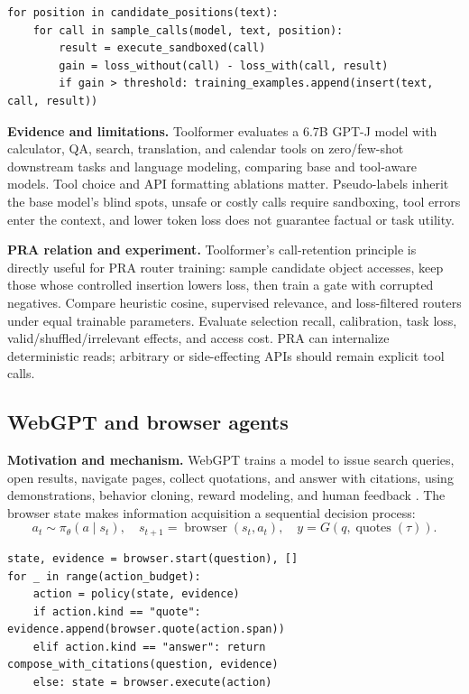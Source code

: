 \begin{lstlisting}[caption={Loss-improvement filtering for pseudo-labeled calls}]
for position in candidate_positions(text):
    for call in sample_calls(model, text, position):
        result = execute_sandboxed(call)
        gain = loss_without(call) - loss_with(call, result)
        if gain > threshold: training_examples.append(insert(text, call, result))
\end{lstlisting}

\textbf{Evidence and limitations.} Toolformer evaluates a 6.7B GPT-J model with calculator,
QA, search, translation, and calendar tools on zero/few-shot downstream tasks and language
modeling, comparing base and tool-aware models.  Tool choice and API formatting ablations
matter.  Pseudo-labels inherit the base model's blind spots, unsafe or costly calls require
sandboxing, tool errors enter the context, and lower token loss does not guarantee factual
or task utility.

\textbf{PRA relation and experiment.} Toolformer's call-retention principle is directly
useful for PRA router training: sample candidate object accesses, keep those whose controlled
insertion lowers loss, then train a gate with corrupted negatives.  Compare heuristic cosine,
supervised relevance, and loss-filtered routers under equal trainable parameters.  Evaluate
selection recall, calibration, task loss, valid/shuffled/irrelevant effects, and access cost.
PRA can internalize deterministic reads; arbitrary or side-effecting APIs should remain
explicit tool calls.

\subsection{WebGPT and browser agents}

\textbf{Motivation and mechanism.} WebGPT trains a model to issue search queries, open
results, navigate pages, collect quotations, and answer with citations, using demonstrations,
behavior cloning, reward modeling, and human feedback \citep{nakano2021webgpt}.  The browser
state makes information acquisition a sequential decision process:
\begin{equation}
a_t\sim\pi_\theta(a\mid s_t),\quad s_{t+1}=\operatorname{browser}(s_t,a_t),
\quad y=G(q,\operatorname{quotes}(\tau)).
\end{equation}

\begin{lstlisting}[caption={Citation-preserving browser loop}]
state, evidence = browser.start(question), []
for _ in range(action_budget):
    action = policy(state, evidence)
    if action.kind == "quote": evidence.append(browser.quote(action.span))
    elif action.kind == "answer": return compose_with_citations(question, evidence)
    else: state = browser.execute(action)
\end{lstlisting}

